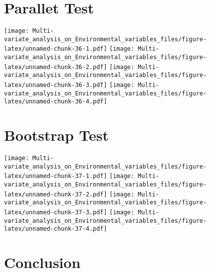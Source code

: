 \documentclass[]{book}
\begin{document}
\hypertarget{parallet-test-1}{%
\section{Parallet Test}\label{parallet-test-1}}

\texttt{[image: Multi-variate\_analysis\_on\_Environmental\_variables\_files/figure-latex/unnamed-chunk-36-1.pdf]}
\texttt{[image: Multi-variate\_analysis\_on\_Environmental\_variables\_files/figure-latex/unnamed-chunk-36-2.pdf]}
\texttt{[image: Multi-variate\_analysis\_on\_Environmental\_variables\_files/figure-latex/unnamed-chunk-36-3.pdf]}
\texttt{[image: Multi-variate\_analysis\_on\_Environmental\_variables\_files/figure-latex/unnamed-chunk-36-4.pdf]}

\hypertarget{bootstrap-test-1}{%
\section{Bootstrap Test}\label{bootstrap-test-1}}

\texttt{[image: Multi-variate\_analysis\_on\_Environmental\_variables\_files/figure-latex/unnamed-chunk-37-1.pdf]}
\texttt{[image: Multi-variate\_analysis\_on\_Environmental\_variables\_files/figure-latex/unnamed-chunk-37-2.pdf]}
\texttt{[image: Multi-variate\_analysis\_on\_Environmental\_variables\_files/figure-latex/unnamed-chunk-37-3.pdf]}
\texttt{[image: Multi-variate\_analysis\_on\_Environmental\_variables\_files/figure-latex/unnamed-chunk-37-4.pdf]}

\hypertarget{conclusion-1}{%
\section{Conclusion}\label{conclusion-1}}
\end{document}
